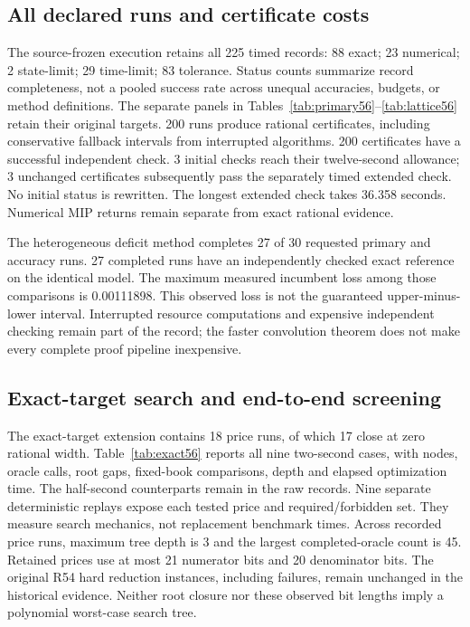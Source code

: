 \subsection{All declared runs and certificate costs}
The source-frozen execution retains all 225 timed records: 88 exact; 23 numerical; 2 state-limit; 29 time-limit; 83 tolerance. Status counts summarize record completeness, not a pooled success rate across unequal accuracies, budgets, or method definitions. The separate panels in Tables~\ref{tab:primary56}--\ref{tab:lattice56} retain their original targets. 200 runs produce rational certificates, including conservative fallback intervals from interrupted algorithms. 200 certificates have a successful independent check. 3 initial checks reach their twelve-second allowance; 3 unchanged certificates subsequently pass the separately timed extended check. No initial status is rewritten. The longest extended check takes 36.358 seconds. Numerical MIP returns remain separate from exact rational evidence.

The heterogeneous deficit method completes 27 of 30 requested primary and accuracy runs. 27 completed runs have an independently checked exact reference on the identical model. The maximum measured incumbent loss among those comparisons is 0.00111898. This observed loss is not the guaranteed upper-minus-lower interval. Interrupted resource computations and expensive independent checking remain part of the record; the faster convolution theorem does not make every complete proof pipeline inexpensive.

\subsection{Exact-target search and end-to-end screening}
The exact-target extension contains 18 price runs, of which 17 close at zero rational width. Table~\ref{tab:exact56} reports all nine two-second cases, with nodes, oracle calls, root gaps, fixed-book comparisons, depth and elapsed optimization time. The half-second counterparts remain in the raw records. Nine separate deterministic replays expose each tested price and required/forbidden set. They measure search mechanics, not replacement benchmark times. Across recorded price runs, maximum tree depth is 3 and the largest completed-oracle count is 45. Retained prices use at most 21 numerator bits and 20 denominator bits. The original R54 hard reduction instances, including failures, remain unchanged in the historical evidence. Neither root closure nor these observed bit lengths imply a polynomial worst-case search tree.

